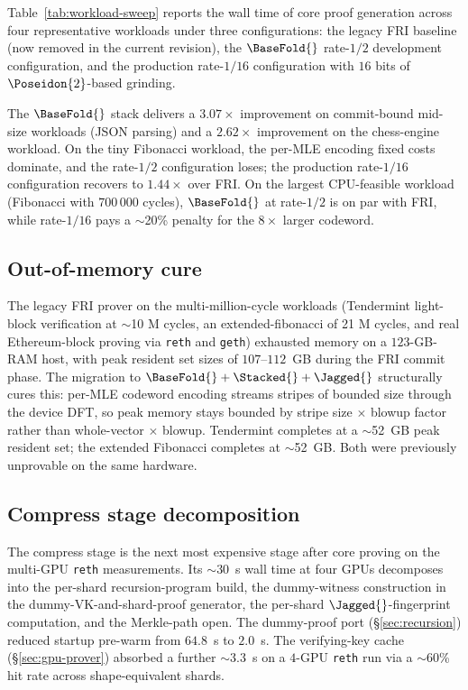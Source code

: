 Table~\ref{tab:workload-sweep} reports the wall time of core proof generation across four representative workloads under three configurations: the legacy FRI baseline (now removed in the current revision), the $\BaseFold{}$ rate-$1/2$ development configuration, and the production rate-$1/16$ configuration with $16$ bits of $\Poseidon{2}$-based grinding.

The $\BaseFold{}$ stack delivers a $3.07\times$ improvement on commit-bound mid-size workloads (JSON parsing) and a $2.62\times$ improvement on the chess-engine workload. On the tiny Fibonacci workload, the per-MLE encoding fixed costs dominate, and the rate-$1/2$ configuration loses; the production rate-$1/16$ configuration recovers to $1.44\times$ over FRI. On the largest CPU-feasible workload (Fibonacci with $700\,000$ cycles), $\BaseFold{}$ at rate-$1/2$ is on par with FRI, while rate-$1/16$ pays a $\sim$20\% penalty for the $8\times$ larger codeword.

\subsection{Out-of-memory cure}

The legacy FRI prover on the multi-million-cycle workloads (Tendermint light-block verification at $\sim$10 M cycles, an extended-fibonacci of 21 M cycles, and real Ethereum-block proving via \texttt{reth} and \texttt{geth}) exhausted memory on a $123$-GB-RAM host, with peak resident set sizes of $107$--$112$~GB during the FRI commit phase. The migration to $\BaseFold{}+\Stacked{}+\Jagged{}$ structurally cures this: per-MLE codeword encoding streams stripes of bounded size through the device DFT, so peak memory stays bounded by stripe size $\times$ blowup factor rather than whole-vector $\times$ blowup. Tendermint completes at a $\sim$52~GB peak resident set; the extended Fibonacci completes at $\sim$52~GB. Both were previously unprovable on the same hardware.

\subsection{Compress stage decomposition}

The compress stage is the next most expensive stage after core proving on the multi-GPU \texttt{reth} measurements. Its $\sim$30~s wall time at four GPUs decomposes into the per-shard recursion-program build, the dummy-witness construction in the dummy-VK-and-shard-proof generator, the per-shard $\Jagged{}$-fingerprint computation, and the Merkle-path open. The dummy-proof port (\S\ref{sec:recursion}) reduced startup pre-warm from $64.8$~s to $2.0$~s. The verifying-key cache (\S\ref{sec:gpu-prover}) absorbed a further $\sim$3.3~s on a $4$-GPU \texttt{reth} run via a $\sim$60\% hit rate across shape-equivalent shards.

